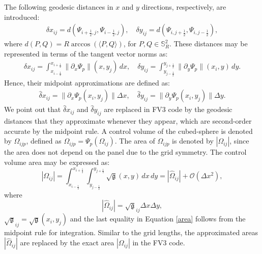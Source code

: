 \documentclass[preprint,12pt]{elsarticle}
\begin{document}
\begin{linenumbers}
The following geodesic distances in $x$ and $y$ directions, respectively, are introduced:
\begin{align}
	\label{distcube}
	{\delta} x_{ij} = d(\Psi_{i+\frac{1}{2},j},\Psi_{i-\frac{1}{2},j}) , \quad
	{\delta} y_{ij} = d(\Psi_{i,j+\frac{1}{2}},\Psi_{i,j-\frac{1}{2}}),
\end{align}
where $d(P,Q) = R\arccos{(\langle P, Q \rangle)}$, for $P,Q \in \mathbb{S}^2_R$.
These distances may be represented in terms of the tangent vector norms as:
\begin{align}
	{\delta} x_{ij} = 
	\int_{x_{i-\frac{1}{2}}}^{x_{i+\frac{1}{2}}}
	\|\partial_x  {\Psi}_{p}\|(x,y_j) \,dx ,\quad
	{\delta} y_{ij} =
	\int_{y_{j-\frac{1}{2}}}^{y_{j+\frac{1}{2}}}
	\|\partial_y {\Psi}_{p}\|(x_i,y) \,dy.
\end{align}
Hence, their midpoint approximations are defined as:
\begin{align}
	\label{distcube2}
	\hat{\delta} x_{ij} = \|\partial_x {\Psi}_{p}(x_i,y_j)  \|\Delta x,\quad
	\hat{\delta} y_{ij} = \|\partial_y {\Psi}_{p}(x_i,y_j) \|\Delta y.
\end{align}
We point out that $\hat{\delta} x_{ij}$ and $\hat{\delta} y_{ij}$ are replaced in FV3 code by the geodesic distances that they approximate whenever they appear, which are second-order accurate by the midpoint rule.
A control volume of the cubed-sphere is denoted by $\Omega_{ijp}$, defined as $\Omega_{ijp} = {\Psi}_p(\Omega_{ij})$.
The area of $\Omega_{ijp}$ is denoted by $|\Omega_{ij}|$,
since the area does not depend on the panel due to the grid symmetry.
The control volume area may be expressed as:
\begin{equation}
	\label{area}
	|\Omega_{ij}| = \int_{x_{i-\frac{1}{2}}}^{x_{i+\frac{1}{2}}} \int_{y_{j-\frac{1}{2}}}^{y_{j+\frac{1}{2}}}{\sqrt{\mathfrak{g}}(x,y)} \,dx \,dy = 
	|\hat{\Omega}_{ij}| + \mathcal{O}(\Delta x^2),
\end{equation}
where 
\begin{equation}
	\label{area2}
	|\hat{\Omega}_{ij}| = \sqrt{\mathfrak{g}}_{ij} \Delta x \Delta y,
\end{equation} $\sqrt{\mathfrak{g}}_{ij}=\sqrt{\mathfrak{g}}(x_i,y_j) $
and the last equality in Equation \eqref{area} follows from the midpoint rule for integration.
Similar to the grid lengths, the approximated areas $|\hat{\Omega}_{ij}|$ are replaced by the exact area $|\Omega_{ij}|$ in the FV3 code.
\begin{table}[htbp]

\end{table}
\end{linenumbers}
\end{document}
